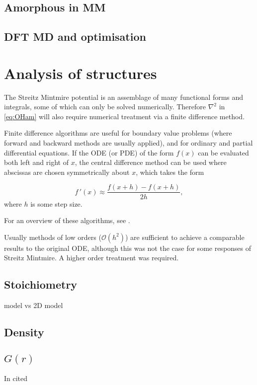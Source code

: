 \subsection{Amorphous \texorpdfstring{}{AlOₓ} in MM}
\subsection{DFT MD and optimisation}
\section{Analysis of structures}
The Streitz Mintmire potential \cite{Streitz1994} is an assemblage of many functional forms and integrals, some of which can only be solved numerically.
Therefore $\nabla^2$ in \cref{eq:OHam} will also require numerical treatment via a finite difference method.

Finite difference algorithms are useful for boundary value problems (where forward and backward methods are usually applied), and for ordinary and partial differential equations.
If the ODE (or PDE) of the form $f(x)$ can be evaluated both left and right of $x$, the central difference method can be used where abscissas are chosen symmetrically about $x$, which takes the form

\begin{equation}
f\,'(x) \approx \frac{f(x+h)-f(x+h)}{2h},\label{eq:simplecdiff}
\end{equation}
where $h$ is some step size.
\begin{marginfigure}
\resizebox{5em}{!}{}
\end{marginfigure}
For an overview of these algorithms, see .

Usually methods of low orders (\eg $\mathcal{O}(h^2)$) are sufficient to achieve a comparable results to the original ODE, although this was not the case for some responses of Streitz Mintmire.
A higher order treatment was required.

\subsection{Stoichiometry}
 model vs 2D model
\subsection{Density}
\subsection{\texorpdfstring{$G(r)$}{G(r)}}
In cited \cite{Xu1997} 